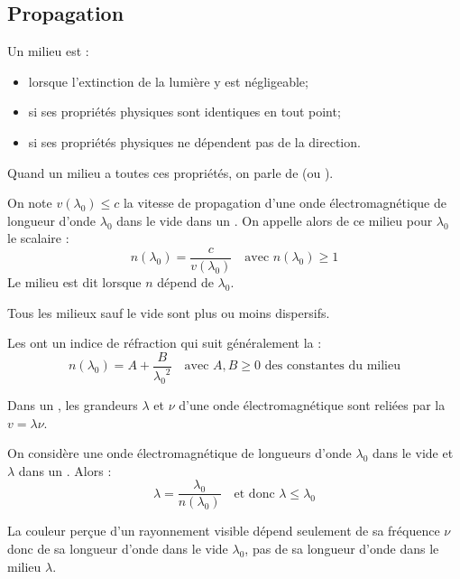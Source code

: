 \subsection{Propagation}

\begin{definition}
Un milieu est :
\begin{itemize}
\item {} lorsque l'extinction de la lumière y est négligeable;
\item {} si ses propriétés physiques sont identiques en tout point;
\item {} si ses propriétés physiques ne dépendent pas de la direction.
\end{itemize}
Quand un milieu a toutes ces propriétés, on parle de  (ou ).
\end{definition}

\begin{definition}
On note $v(\lambda_0) \leq c$ la vitesse de propagation d'une onde électromagnétique de longueur d'onde $\lambda_0$ dans le vide dans un . On appelle alors  de ce milieu pour $\lambda_0$ le scalaire :
\[n(\lambda_0) = \frac{c}{v(\lambda_0)} \quad \text{avec } n(\lambda_0) \geq 1\] 
Le milieu est dit  lorsque $n$ dépend de $\lambda_0$.
\end{definition}

\begin{remarque}
Tous les milieux sauf le vide sont plus ou moins dispersifs.
\end{remarque}

\begin{propriete}[admis]
Les  ont un indice de réfraction qui suit généralement la  :
\[n(\lambda_0) = A + \frac{B}{{\lambda_0}^2} \quad \text{avec } A, B \geq 0 \text{ des constantes du milieu}\]
\end{propriete}

\begin{propriete}[admis]
Dans un , les grandeurs $\lambda$ et $\nu$ d'une onde électromagnétique sont reliées par la  $v = \lambda \nu$.
\end{propriete}

\begin{propriete}
On considère une onde électromagnétique de longueurs d'onde $\lambda_0$ dans le vide et $\lambda$ dans un . Alors :
\[\lambda = \frac{\lambda_0}{n(\lambda_0)} \quad \text{et donc } \lambda \leq \lambda_0\]
\end{propriete}

\begin{remarque}
La couleur perçue d'un rayonnement visible dépend seulement de sa fréquence $\nu$ donc de sa longueur d'onde dans le vide $\lambda_0$, pas de sa longueur d'onde dans le milieu $\lambda$.
\end{remarque}